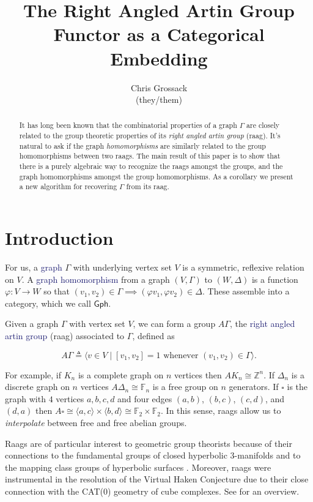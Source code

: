 \documentclass[12pt]{article}
\author{Chris Grossack\\ (they/them)}
\title{The Right Angled Artin Group Functor as a Categorical Embedding}
\theoremstyle{definition}
\theoremstyle{theorem}
\newcommand{\teq}{\triangleq}
\newcommand*{\important}[1]{\textcolor{MidnightBlue}{#1}}
\begin{document}
\maketitle

\begin{abstract}
  It has long been known that the combinatorial properties of a graph $\Gamma$
  are closely related to the group theoretic properties of its 
  \emph{right angled artin group} (raag). It's natural to ask if the 
  graph \emph{homomorphisms} are similarly related to the group homomorphisms 
  between two raags. The main result of this paper is to show that there 
  is a purely algebraic way to recognize the raags amongst the groups, and 
  the graph homomorphisms amongst the group homomorphisms. 
  As a corollary we 
  present a new algorithm for recovering $\Gamma$ from its raag.
\end{abstract}

\section{Introduction}
\label{intro}
  For us, a \important{graph} $\Gamma$ with underlying vertex set $V$ is a 
  symmetric, reflexive relation on $V$. A \important{graph homomorphism} from 
  a graph $(V,\Gamma)$ to $(W,\Delta)$ is a 
  function $\varphi : V \to W$ so that $(v_1, v_2) \in \Gamma \implies (\varphi v_1, \varphi v_2) \in \Delta$.
  These assemble into a category, which we call $\mathsf{Gph}$.

  Given a graph $\Gamma$ with vertex set $V$, we can form a group $A\Gamma$, the 
  \important{right angled artin group} (raag) associated to $\Gamma$, defined as

  \[ A\Gamma \teq \langle v \in V \mid [v_1, v_2] = 1 \text{ whenever } (v_1,v_2) \in \Gamma \rangle .\]

  For example, if $K_n$ is a complete graph on $n$ vertices then 
  $AK_n \cong \mathbb{Z}^n$. If $\Delta_n$ is a discrete graph on $n$ vertices
  $A\Delta_n \cong \mathbb{F}_n$ is a free group on $n$ generators. 
  If $\square$ is the graph with $4$ vertices $a,b,c,d$ and 
  four edges $(a,b)$, $(b,c)$, $(c,d)$, and $(d,a)$ then $A \square \cong 
  \langle a, c \rangle \times \langle b, d \rangle \cong \mathbb{F}_2 \times \mathbb{F}_2$.
  In this sense, raags allow us to \emph{interpolate} between free and free
  abelian groups. 

  Raags are of particular interest to geometric group theorists because
  of their connections to the fundamental groups of closed hyperbolic
  $3$-manifolds \cite{servatiusSurfaceSubgroupsGraph1989} 
  and to the mapping class groups of hyperbolic surfaces 
  \cite{kimGeometryCurveGraph2014}. Moreover, raags were instrumental in
  the resolution of the Virtual Haken Conjecture \cite{agolVirtualHakenConjecture2013}
  due to their close connection with the CAT(0) geometry of cube complexes. 
  See \cite{bestvinaGeometricGroupTheory2013} for an overview.
\end{document}
